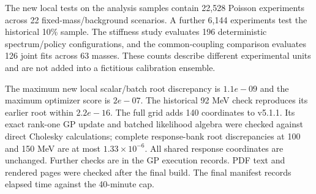 The new local tests on the analysis samples contain 22,528 Poisson experiments across 22 fixed-mass/background scenarios. A further 6,144 experiments test the historical 10\% sample. The stiffness study evaluates 196 deterministic spectrum/policy configurations, and the common-coupling comparison evaluates 126 joint fits across 63 masses. These counts describe different experimental units and are not added into a fictitious calibration ensemble.

The maximum new local scalar/batch root discrepancy is $1.1e-09$ and the maximum optimizer score is $2e-07$. The historical 92 MeV check reproduces its earlier root within $2.2e-16$. The full grid adds 140 coordinates to v5.1.1. Its exact rank-one GP update and batched likelihood algebra were checked against direct Cholesky calculations; complete response-bank root discrepancies at 100 and 150 MeV are at most $1.33\times10^{-6}$. All shared response coordinates are unchanged. Further checks are in the GP execution records. PDF text and rendered pages were checked after the final build. The final manifest records elapsed time against the 40-minute cap.
